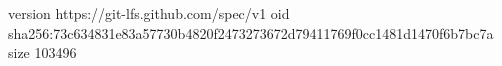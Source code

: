 version https://git-lfs.github.com/spec/v1
oid sha256:73c634831e83a57730b4820f2473273672d79411769f0cc1481d1470f6b7bc7a
size 103496
